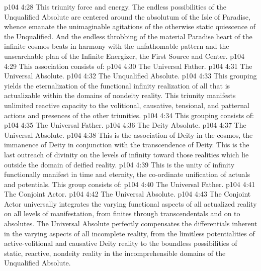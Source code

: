 \vs p104 4:28 This triunity  force and energy. The endless possibilities of the Unqualified Absolute are centered around the absolutum of the Isle of Paradise, whence emanate the unimaginable agitations of the otherwise static quiescence of the Unqualified. And the endless throbbing of the material Paradise heart of the infinite cosmos beats in harmony with the unfathomable pattern and the unsearchable plan of the Infinite Energizer, the First Source and Center.
\vs p104 4:29 \pc {} This association consists of:
\vs p104 4:30 \bibnobreakspace The Universal Father.
\vs p104 4:31 \bibnobreakspace The Universal Absolute.
\vs p104 4:32 \bibnobreakspace The Unqualified Absolute.
\vs p104 4:33 \pc This grouping yields the eternalization of the functional infinity realization of all that is actualizable within the domains of nondeity reality. This triunity manifests unlimited reactive capacity to the volitional, causative, tensional, and patternal actions and presences of the other triunities.
\vs p104 4:34 \pc {} This grouping consists of:
\vs p104 4:35 \bibnobreakspace The Universal Father.
\vs p104 4:36 \bibnobreakspace The Deity Absolute.
\vs p104 4:37 \bibnobreakspace The Universal Absolute.
\vs p104 4:38 This is the association of Deity\hyp{}in\hyp{}the\hyp{}cosmos, the immanence of Deity in conjunction with the transcendence of Deity. This is the last outreach of divinity on the levels of infinity toward those realities which lie outside the domain of deified reality.
\vs p104 4:39 \pc {} This is the unity of infinity functionally manifest in time and eternity, the co\hyp{}ordinate unification of actuals and potentials. This group consists of:
\vs p104 4:40 \bibnobreakspace The Universal Father.
\vs p104 4:41 \bibnobreakspace The Conjoint Actor.
\vs p104 4:42 \bibnobreakspace The Universal Absolute.
\vs p104 4:43 \pc The Conjoint Actor universally integrates the varying functional aspects of all actualized reality on all levels of manifestation, from finites through transcendentals and on to absolutes. The Universal Absolute perfectly compensates the differentials inherent in the varying aspects of all incomplete reality, from the limitless potentialities of active\hyp{}volitional and causative Deity reality to the boundless possibilities of static, reactive, nondeity reality in the incomprehensible domains of the Unqualified Absolute.
